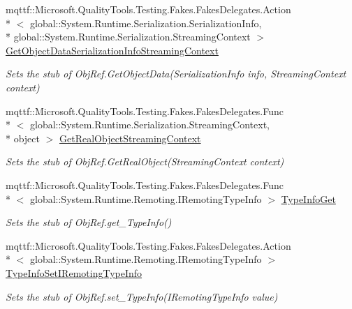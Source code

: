 \begin{DoxyCompactItemize}
mqttf\-::\-Microsoft.\-Quality\-Tools.\-Testing.\-Fakes.\-Fakes\-Delegates.\-Action\\*
$<$ global\-::\-System.\-Runtime.\-Serialization.\-Serialization\-Info, \\*
global\-::\-System.\-Runtime.\-Serialization.\-Streaming\-Context $>$ \hyperlink{class_system_1_1_runtime_1_1_remoting_1_1_fakes_1_1_stub_obj_ref_ac859b95261c37020b385ecb41b0151bc}{Get\-Object\-Data\-Serialization\-Info\-Streaming\-Context}
\begin{DoxyCompactList}\small\item\em Sets the stub of Obj\-Ref.\-Get\-Object\-Data(\-Serialization\-Info info, Streaming\-Context context)\end{DoxyCompactList}\item 
mqttf\-::\-Microsoft.\-Quality\-Tools.\-Testing.\-Fakes.\-Fakes\-Delegates.\-Func\\*
$<$ global\-::\-System.\-Runtime.\-Serialization.\-Streaming\-Context, \\*
object $>$ \hyperlink{class_system_1_1_runtime_1_1_remoting_1_1_fakes_1_1_stub_obj_ref_a8d23ffcec270721a96c7868d54c71ab1}{Get\-Real\-Object\-Streaming\-Context}
\begin{DoxyCompactList}\small\item\em Sets the stub of Obj\-Ref.\-Get\-Real\-Object(\-Streaming\-Context context)\end{DoxyCompactList}\item 
mqttf\-::\-Microsoft.\-Quality\-Tools.\-Testing.\-Fakes.\-Fakes\-Delegates.\-Func\\*
$<$ global\-::\-System.\-Runtime.\-Remoting.\-I\-Remoting\-Type\-Info $>$ \hyperlink{class_system_1_1_runtime_1_1_remoting_1_1_fakes_1_1_stub_obj_ref_a40bf3537add0eb3283f180c0bfcd102f}{Type\-Info\-Get}
\begin{DoxyCompactList}\small\item\em Sets the stub of Obj\-Ref.\-get\-\_\-\-Type\-Info()\end{DoxyCompactList}\item 
mqttf\-::\-Microsoft.\-Quality\-Tools.\-Testing.\-Fakes.\-Fakes\-Delegates.\-Action\\*
$<$ global\-::\-System.\-Runtime.\-Remoting.\-I\-Remoting\-Type\-Info $>$ \hyperlink{class_system_1_1_runtime_1_1_remoting_1_1_fakes_1_1_stub_obj_ref_a0876c833d8fcbb1cb80e5327ab2c02c7}{Type\-Info\-Set\-I\-Remoting\-Type\-Info}
\begin{DoxyCompactList}\small\item\em Sets the stub of Obj\-Ref.\-set\-\_\-\-Type\-Info(\-I\-Remoting\-Type\-Info value)\end{DoxyCompactList}\item 

\end{DoxyCompactItemize}
